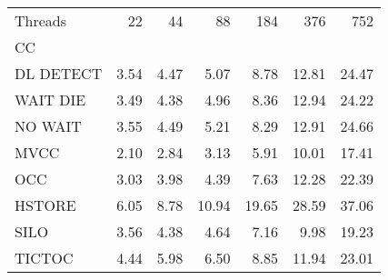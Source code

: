 \begin{tabular}{lrrrrrr}
\toprule
Threads &  22  &  44  &   88  &   184 &   376 &   752 \\
CC        &      &      &       &       &       &       \\
\midrule
DL DETECT & 3.54 & 4.47 &  5.07 &  8.78 & 12.81 & 24.47 \\
WAIT DIE  & 3.49 & 4.38 &  4.96 &  8.36 & 12.94 & 24.22 \\
NO WAIT   & 3.55 & 4.49 &  5.21 &  8.29 & 12.91 & 24.66 \\
MVCC      & 2.10 & 2.84 &  3.13 &  5.91 & 10.01 & 17.41 \\
OCC       & 3.03 & 3.98 &  4.39 &  7.63 & 12.28 & 22.39 \\
HSTORE    & 6.05 & 8.78 & 10.94 & 19.65 & 28.59 & 37.06 \\
SILO      & 3.56 & 4.38 &  4.64 &  7.16 &  9.98 & 19.23 \\
TICTOC    & 4.44 & 5.98 &  6.50 &  8.85 & 11.94 & 23.01 \\
\bottomrule
\end{tabular}
